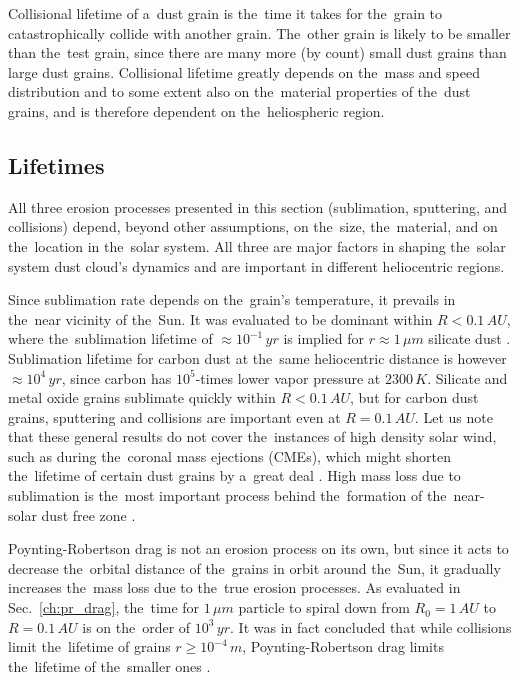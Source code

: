 Collisional lifetime of a~dust grain is the~time it takes for the~grain to catastrophically collide with another grain. The~other grain is likely to be smaller than the~test grain, since there are many more (by count) small dust grains than large dust grains. Collisional lifetime greatly depends on the~mass and speed distribution and to some extent also on the~material properties of the~dust grains, and is therefore dependent on the~heliospheric region. 

\subsection{Lifetimes}

All three erosion processes presented in this section (sublimation, sputtering, and collisions) depend, beyond other assumptions, on the~size, the~material, and on the~location in the~solar system. All three are major factors in shaping the~solar system dust cloud's dynamics and are important in different heliocentric regions. 

Since sublimation rate depends on the~grain's temperature, it prevails in the~near vicinity of the~Sun. It was evaluated to be dominant within $R < 0.1 \, \si{AU}$, where the~sublimation lifetime of $\approx 10^{-1} \, \si{yr}$ is implied for $r \approx 1 \, \si{\mu m}$ silicate dust \citep{baumann2020dust}. Sublimation lifetime for carbon dust at the~same heliocentric distance is however $\approx 10^{4} \, \si{yr}$, since carbon has \mbox{$10^5$-times} lower vapor pressure at $2300\, \si{K}$. Silicate and metal oxide grains sublimate quickly within $R<0.1\, \si{AU}$, but for carbon dust grains, sputtering and collisions are important even at $R = 0.1 \, \si{AU}$. Let us note that these general results do not cover the~instances of high density solar wind, such as during the~coronal mass ejections ({CMEs}), which might shorten the~lifetime of certain dust grains by a~great deal \citep{baumann2020dust}. High mass loss due to sublimation is the~most important process behind the~formation of the~near-solar dust free zone \citep{russell1929meteoric}. 

Poynting-Robertson drag is not an erosion process on its own, but since it acts to decrease the~orbital distance of the~grains in orbit around the~Sun, it gradually increases the~mass loss due to the~true erosion processes. As evaluated in Sec.~\ref{ch:pr_drag}, the~time for $1 \, \si{\mu m}$ particle to spiral down from $R_0 = 1 \, \si{AU}$ to $R = 0.1 \, \si{AU}$ is on the~order of $10^3 \, \si{yr}$. It was in fact concluded that while collisions limit the~lifetime of grains $r \geq 10^{-4} \, \si{m}$, Poynting-Robertson drag limits the~lifetime of the~smaller ones \citep{grun1985collisional}. 

